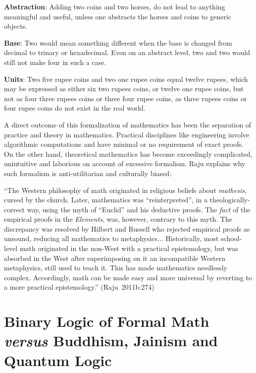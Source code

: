 {{\bf Abstraction}}: Adding two coins and two horses, do not lead to anything meaningful and useful, unless one abstracts the horses and coins to generic objects.

{{\bf Base}}: Two would mean something different when the base is changed from decimal to trinary or hexadecimal. Even on an abstract level, two and two would still not make four in such a case.

{{\bf Units}}: Two five rupee coins and two one rupee coins equal twelve rupees, which may be expressed as either six two rupees coins, or twelve one rupee coins, but not as four three rupees coins or three four rupee coins, as three rupees coins or four rupee coins do not exist in the real world.

A direct outcome of this formalization of mathematics has been the separation of practice and theory in mathematics. Practical disciplines like engineering involve algorithmic computations and have minimal or no requirement of exact proofs. On the other hand, theoretical mathematics has become exceedingly complicated, unintuitive and laborious on account of excessive formalism. Raju explains why such formalism is anti-utilitarian and culturally biased: 
\begin{myquote}
``The Western philosophy of math originated in religious beliefs about {\sl mathesis}, cursed by the church. Later, mathematics was ``reinterpreted'', in a theologically-correct way, using the myth of ``Euclid'' and his deductive proofs. The {\sl fact} of the empirical proofs in the {\sl Elements}, was, however, contrary to this myth. The discrepancy was resolved by Hilbert and Russell who rejected empirical proofs as unsound, reducing all mathematics to metaphysics... Historically, most school-level math originated in the non-West with a practical epistemology, but was absorbed in the West after superimposing on it an incompatible Western metaphysics, still used to teach it. This has made mathematics needlessly complex. Accordingly, math can be made easy and more universal by reverting to a more practical epistemology.''
\hfill \hbox{(Raju 2011b:274)}
\end{myquote}

\section*{Binary Logic of Formal Math {\sl versus} Buddhism, Jainism and Quantum Logic}

